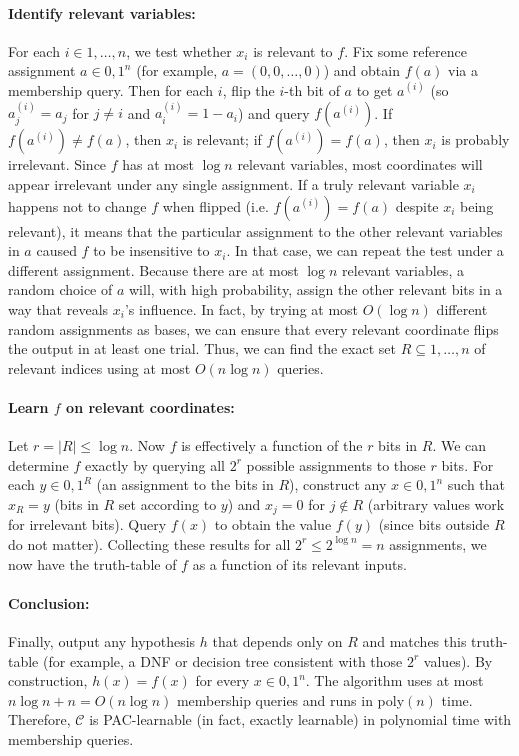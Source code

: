 \documentclass[11pt]{article}
\DeclareMathOperator{\1}{\mathbbm{1}}
\begin{document}
\paragraph{Identify relevant variables:} For each $i\in{1,\ldots,n}$, we test whether $x_i$ is relevant to $f$. Fix some reference assignment $a\in{0,1}^n$ (for example, $a=(0,0,\dots,0)$) and obtain $f(a)$ via a membership query. Then for each $i$, flip the $i$-th bit of $a$ to get $a^{(i)}$ (so $a^{(i)}_j = a_j$ for $j\neq i$ and $a^{(i)}_i = 1- a_i$) and query $f(a^{(i)})$. If $f(a^{(i)}) \neq f(a)$, then $x_i$ is relevant; if $f(a^{(i)}) = f(a)$, then $x_i$ is probably irrelevant. Since $f$ has at most $\log n$ relevant variables, most coordinates will appear irrelevant under any single assignment. If a truly relevant variable $x_i$ happens not to change $f$ when flipped (i.e. $f(a^{(i)}) = f(a)$ despite $x_i$ being relevant), it means that the particular assignment to the other relevant variables in $a$ caused $f$ to be insensitive to $x_i$. In that case, we can repeat the test under a different assignment. Because there are at most $\log n$ relevant variables, a random choice of $a$ will, with high probability, assign the other relevant bits in a way that reveals $x_i$’s influence. In fact, by trying at most $O(\log n)$ different random assignments as bases, we can ensure that every relevant coordinate flips the output in at least one trial. Thus, we can find the exact set $R \subseteq {1,\ldots,n}$ of relevant indices using at most $O(n \log n)$ queries.

\paragraph{Learn $f$ on relevant coordinates:} Let $r = |R| \le \log n$. Now $f$ is effectively a function of the $r$ bits in $R$. We can determine $f$ exactly by querying all $2^r$ possible assignments to those $r$ bits. For each $y \in {0,1}^R$ (an assignment to the bits in $R$), construct any $x \in {0,1}^n$ such that $x_R = y$ (bits in $R$ set according to $y$) and $x_j = 0$ for $j \notin R$ (arbitrary values work for irrelevant bits). Query $f(x)$ to obtain the value $f(y)$ (since bits outside $R$ do not matter). Collecting these results for all $2^r \le 2^{\log n} = n$ assignments, we now have the truth-table of $f$ as a function of its relevant inputs.

\paragraph{Conclusion:} Finally, output any hypothesis $h$ that depends only on $R$ and matches this truth-table (for example, a DNF or decision tree consistent with those $2^r$ values). By construction, $h(x) = f(x)$ for every $x \in {0,1}^n$. The algorithm uses at most $n\log n + n = O(n \log n)$ membership queries and runs in poly$(n)$ time. Therefore, $\mathcal{C}$ is PAC-learnable (in fact, exactly learnable) in polynomial time with membership queries.
\end{document}
